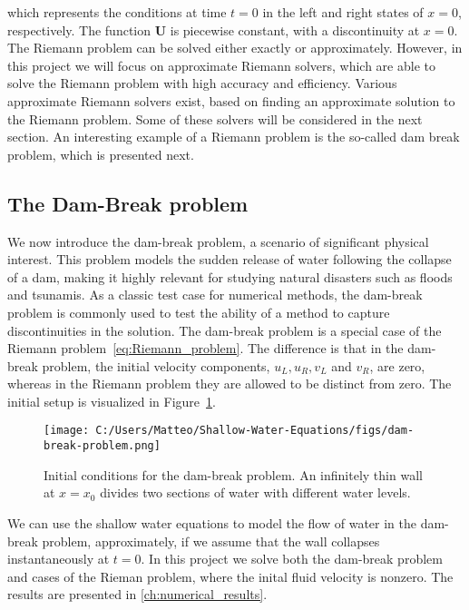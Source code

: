 which represents the conditions at time $t = 0$ in the left and right states of $x=0$, respectively.
The function $\mathbf{U}$ is piecewise constant, with a discontinuity at $x=0$.
The Riemann problem can be solved either exactly or approximately.
However, in this project we will focus on approximate Riemann solvers, which are able to solve the Riemann problem with high accuracy and efficiency.
Various approximate Riemann solvers exist, based on finding an approximate solution to the Riemann problem.
Some of these solvers will be considered in the next section.
An interesting example of a Riemann problem is the so-called dam break problem, which is presented next.

\subsection{The Dam-Break problem}
We now introduce the dam-break problem, a scenario of significant physical interest.
This problem models the sudden release of water following the collapse of a dam, making it highly relevant for studying natural disasters such as floods and tsunamis.
As a classic test case for numerical methods, the dam-break problem is commonly used to test the ability of a method to capture discontinuities in the solution.
The dam-break problem is a special case of the Riemann problem~\eqref{eq:Riemann_problem}.
The difference is that in the dam-break problem, the initial velocity components, $u_L, u_R, v_L$ and $v_R$, are zero, whereas in the Riemann problem they are allowed to be distinct from zero.
The initial setup is visualized in Figure~\ref{fig:dam-break-problem}.
\begin{figure}[H]
    \centering
    \texttt{[image: C:/Users/Matteo/Shallow-Water-Equations/figs/dam-break-problem.png]}
    \caption{Initial conditions for the dam-break problem. An infinitely thin wall at $x=x_0$ divides two sections of water with different water levels.}\label{fig:dam-break-problem}
\end{figure}
We can use the shallow water equations to model the flow of water in the dam-break problem, approximately, if we assume that the wall collapses instantaneously at $t=0$.
In this project we solve both the dam-break problem and cases of the Rieman problem, where the inital fluid velocity is nonzero.
The results are presented in \autoref{ch:numerical_results}.

